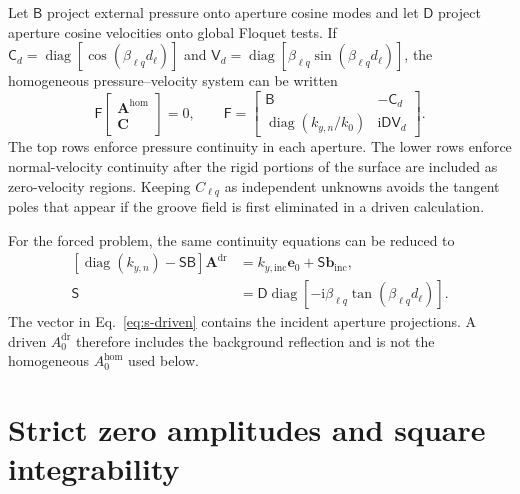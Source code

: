\documentclass[aps,prl,reprint,superscriptaddress,nofootinbib,floatfix]{revtex4-2}
\newcommand{\ii}{\mathrm{i}}
\newcommand{\vect}[1]{\bm{#1}}
\providecommand{\dr}{\mathrm{dr}}
\providecommand{\hom}{\mathrm{hom}}
\providecommand{\inc}{\mathrm{inc}}
\begin{document}
Let $\mathsf B$ project external pressure onto aperture cosine modes and let
$\mathsf D$ project aperture cosine velocities onto global Floquet tests.  If
$\mathsf C_d=\operatorname{diag}[\cos(\beta_{\ell q}d_\ell)]$ and
$\mathsf V_d=\operatorname{diag}[\beta_{\ell q}\sin(\beta_{\ell q}d_\ell)]$, the
homogeneous pressure--velocity system can be written
\begin{equation}
 \mathsf F
 \begin{bmatrix}\vect{A}^{\hom}\\ \vect{C}\end{bmatrix}=0,
 \qquad
 \mathsf F=
 \begin{bmatrix}
  \mathsf B & -\mathsf C_d\\[2pt]
  \operatorname{diag}(k_{y,n}/k_0) & \ii\mathsf D\mathsf V_d
 \end{bmatrix} .
 \label{eq:s-block}
\end{equation}
The top rows enforce pressure continuity in each aperture.  The lower rows
enforce normal-velocity continuity after the rigid portions of the surface
are included as zero-velocity regions.  Keeping $C_{\ell q}$ as independent
unknowns avoids the tangent poles that appear if the groove field is first
eliminated in a driven calculation.

For the forced problem, the same continuity equations can be reduced to
\begin{equation}
\begin{aligned}
 \left[\operatorname{diag}(k_{y,n})-\mathsf S\mathsf B\right]
 \vect{A}^{\dr}&=k_{y,\inc}\vect e_0+\mathsf S\vect b_{\inc},\\
 \mathsf S&=\mathsf D\operatorname{diag}
 \left[-\ii\beta_{\ell q}\tan(\beta_{\ell q}d_\ell)\right].
\end{aligned}
 \label{eq:s-driven}
\end{equation}
The vector in Eq.~\eqref{eq:s-driven} contains the incident aperture
projections.  A driven $A_0^{\dr}$ therefore includes the background
reflection and is not the homogeneous $A_0^{\hom}$ used below.

\section{Strict zero amplitudes and square integrability}
\label{sec:s-strict}
\end{document}
